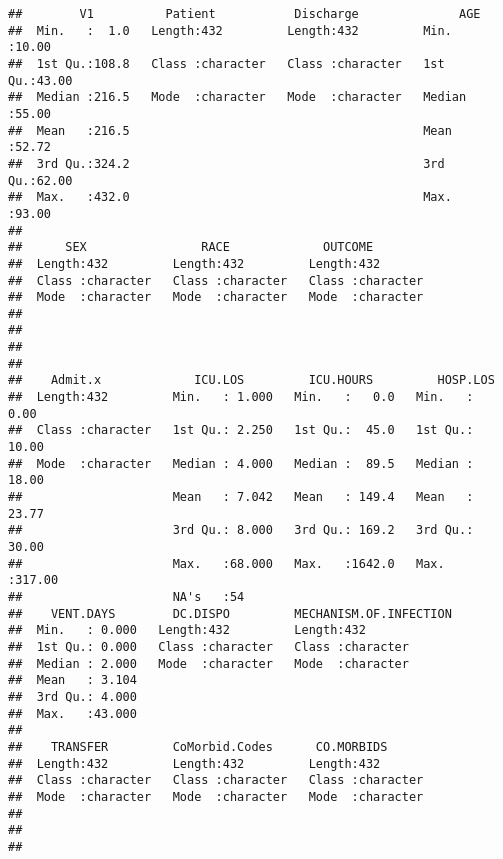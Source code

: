 \documentclass[]{article}
\begin{document}
\begin{verbatim}
##        V1          Patient           Discharge              AGE       
##  Min.   :  1.0   Length:432         Length:432         Min.   :10.00  
##  1st Qu.:108.8   Class :character   Class :character   1st Qu.:43.00  
##  Median :216.5   Mode  :character   Mode  :character   Median :55.00  
##  Mean   :216.5                                         Mean   :52.72  
##  3rd Qu.:324.2                                         3rd Qu.:62.00  
##  Max.   :432.0                                         Max.   :93.00  
##                                                                       
##      SEX                RACE             OUTCOME         
##  Length:432         Length:432         Length:432        
##  Class :character   Class :character   Class :character  
##  Mode  :character   Mode  :character   Mode  :character  
##                                                          
##                                                          
##                                                          
##                                                          
##    Admit.x             ICU.LOS         ICU.HOURS         HOSP.LOS     
##  Length:432         Min.   : 1.000   Min.   :   0.0   Min.   :  0.00  
##  Class :character   1st Qu.: 2.250   1st Qu.:  45.0   1st Qu.: 10.00  
##  Mode  :character   Median : 4.000   Median :  89.5   Median : 18.00  
##                     Mean   : 7.042   Mean   : 149.4   Mean   : 23.77  
##                     3rd Qu.: 8.000   3rd Qu.: 169.2   3rd Qu.: 30.00  
##                     Max.   :68.000   Max.   :1642.0   Max.   :317.00  
##                     NA's   :54                                        
##    VENT.DAYS        DC.DISPO         MECHANISM.OF.INFECTION
##  Min.   : 0.000   Length:432         Length:432            
##  1st Qu.: 0.000   Class :character   Class :character      
##  Median : 2.000   Mode  :character   Mode  :character      
##  Mean   : 3.104                                            
##  3rd Qu.: 4.000                                            
##  Max.   :43.000                                            
##                                                            
##    TRANSFER         CoMorbid.Codes      CO.MORBIDS       
##  Length:432         Length:432         Length:432        
##  Class :character   Class :character   Class :character  
##  Mode  :character   Mode  :character   Mode  :character  
##                                                          
##                                                          
##                                                          

\end{verbatim}
\end{document}

